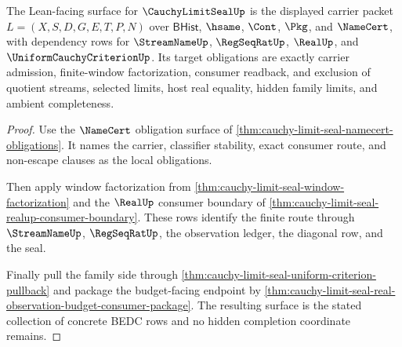 \begin{theorem}
\label{thm:cauchy-limit-seal-formal-target-surface}
The Lean-facing surface for $\CauchyLimitSealUp$ is the displayed carrier packet $L=(X,S,D,G,E,T,P,N)$ over $\mathsf{BHist}$, $\hsame$, $\Cont$, $\Pkg$, and $\NameCert$, with dependency rows for $\StreamNameUp$, $\RegSeqRatUp$, $\RealUp$, and $\UniformCauchyCriterionUp$. Its target obligations are exactly carrier admission, finite-window factorization, consumer readback, and exclusion of quotient streams, selected limits, host real equality, hidden family limits, and ambient completeness.
\end{theorem}
\begin{proof}
Use the $\NameCert$ obligation surface of \autoref{thm:cauchy-limit-seal-namecert-obligations}. It names the carrier, classifier stability, exact consumer route, and non-escape clauses as the local obligations.

Then apply window factorization from \autoref{thm:cauchy-limit-seal-window-factorization} and the $\RealUp$ consumer boundary of \autoref{thm:cauchy-limit-seal-realup-consumer-boundary}. These rows identify the finite route through $\StreamNameUp$, $\RegSeqRatUp$, the observation ledger, the diagonal row, and the seal.

Finally pull the family side through \autoref{thm:cauchy-limit-seal-uniform-criterion-pullback} and package the budget-facing endpoint by \autoref{thm:cauchy-limit-seal-real-observation-budget-consumer-package}. The resulting surface is the stated collection of concrete BEDC rows and no hidden completion coordinate remains.
\end{proof}

